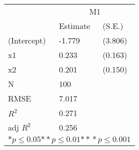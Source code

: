 \begin{tabular}{*{3}{l}}
\hline
                  & \multicolumn{2}{c}{M1}   \tabularnewline
                   &Estimate  &(S.E.)  \tabularnewline
 \hline
 \hline
   (Intercept)     &-1.779   &   (3.806) \tabularnewline
   x1              &0.233   &   (0.163) \tabularnewline
   x2              &0.201   &   (0.150) \tabularnewline
 \hline
 N                 &100       &        \tabularnewline
 RMSE             &7.017         & \tabularnewline
 $R^2$             &0.271         & \tabularnewline
 adj $R^2$         &0.256         & \tabularnewline
 \hline
\hline
 
 \multicolumn{3}{c}{${*  p}\le 0.05$${*\!\!*  p}\le 0.01$${*\!\!*\!\!*  p}\le 0.001$}\tabularnewline
 \end{tabular}
